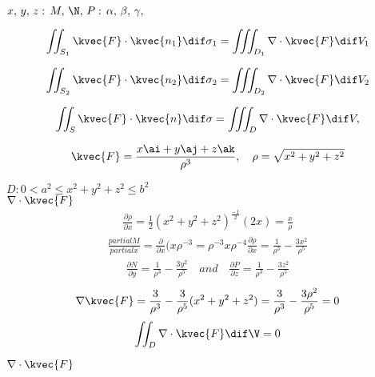 \( x, \, y, \, z: \, M, \, \N, \, P: \, \alpha , \, \beta , \, \gamma , \, \) 

\begin{align*}
\iint_{S{_1}} \kvec{F} \cdot \kvec{n_1} \dif \sigma_{1} = \iiint_{D_{1}} \nabla \cdot \kvec{F} \dif V_1 
\end{align*}

\begin{align*}
\iint_{S{_2}} \kvec{F} \cdot \kvec{n_2} \dif \sigma_{2} = \iiint_{D_{2}} \nabla \cdot \kvec{F} \dif V_2 
\end{align*}

\begin{align*}
\iint_{S} \kvec{F} \cdot \kvec{n} \dif \sigma = \iiint_{D} \nabla \cdot \kvec{F} \dif V ,  
\end{align*}


\begin{align*}
\kvec{F} = \frac{x \ai + y\aj + z \ak}{\rho^3} , \quad \rho = \sqrt{x^2 + y^2 +z^2}
\end{align*}

\( D: 0 < a^2 \le x^2 + y^2 + z^2 \le b^2 \) \\
\( \nabla \cdot \kvec{F} \) \\

\begin{align*}
\frac{\partial \rho }{\partial x} = \frac{1}{2} (x^2 + y^2 +z^2)^{\frac{-1}{2}} (2x) = \frac{x}{\rho}
\end{align*}
\begin{align*}
\frac{partial M}{partial x} = \frac{\partial}{\partial x} (x \rho^{-3} = \rho^{-3} x \rho^{-4} \frac{\partial \rho}{\partial x} = \frac{1}{\rho^{3}} - \frac{3x^2}{\rho^{5}}
\end{align*}
\begin{align*}
\frac{\partial N}{\partial y} = \frac{1}{\rho^{3}} - \frac{3y^2}{\rho^{5}} \quad and \quad \frac{\partial P}{\partial z} = \frac{1}{\rho^{3}} - \frac{3z^2}{\rho^{5}}
\end{align*}
\begin{align*}
\nabla \kvec{F} = \frac{3}{\rho^{3}} - \frac{3}{\rho^{5}} (x^2 + y^2 + z^2 ) = \frac{3}{\rho^{3}} - \frac{3 \rho^{2}}{\rho^{5}} = 0 
\end{align*}
\begin{align*}
\iint_{D} \nabla \cdot \kvec{F} \dif \V = 0
\end{align*}

\( \nabla \cdot \kvec{F} \) 

